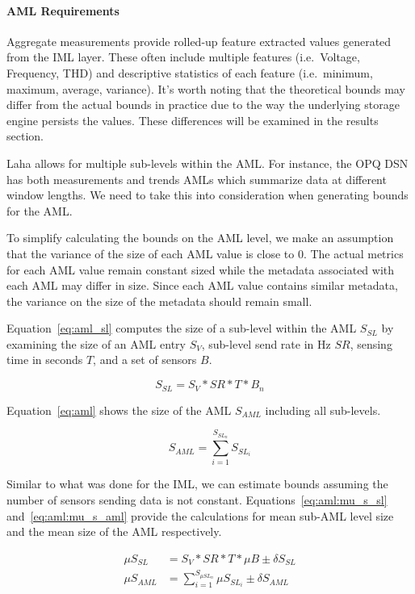 \paragraph{AML Requirements}
Aggregate measurements provide rolled-up feature extracted values generated from the IML layer. These often include multiple features (i.e.\ Voltage, Frequency, THD) and descriptive statistics of each feature (i.e.\ minimum, maximum, average, variance). It's worth noting that the theoretical bounds may differ from the actual bounds in practice due to the way the underlying storage engine persists the values. These differences will be examined in the results section.

Laha allows for multiple sub-levels within the AML. For instance, the OPQ DSN has both measurements and trends AMLs which summarize data at different window lengths. We need to take this into consideration when generating bounds for the AML\@.

To simplify calculating the bounds on the AML level, we make an assumption that the variance of the size of each AML value is close to 0. The actual metrics for each AML value remain constant sized while the metadata associated with each AML may differ in size. Since each AML value contains similar metadata, the variance on the size of the metadata should remain small.

Equation~\ref{eq:aml_sl} computes the size of a sub-level within the AML $S_{SL}$ by examining the size of an AML entry $S_{V}$, sub-level send rate in Hz $SR$, sensing time in seconds $T$, and a set of sensors $B$.

\begin{equation}\label{eq:aml_sl}
	S_{SL} = S_{V} * SR * T * B_{n}
\end{equation}

Equation~\ref{eq:aml} shows the size of the AML $S_{AML}$ including all sub-levels.

\begin{equation}\label{eq:aml}
	S_{AML} = \sum_{i=1}^{S_{SL_{n}}} S_{SL_{i}}
\end{equation}

Similar to what was done for the IML, we can estimate bounds assuming the number of sensors sending data is not constant. Equations~\ref{eq:aml:mu_s_sl} and~\ref{eq:aml:mu_s_aml} provide the calculations for mean sub-AML level size and the mean size of the AML respectively.

\begin{align}
	\mu S_{SL} &= S_{V} * SR * T * \mu B \pm \delta S_{SL} \label{eq:aml:mu_s_sl} \\
	\mu S_{AML} &= \sum_{i=1}^{S_{\mu SL_{n}}} \mu S_{SL_{i}} \pm \delta S_{AML} \label{eq:aml:mu_s_aml}
\end{align}

